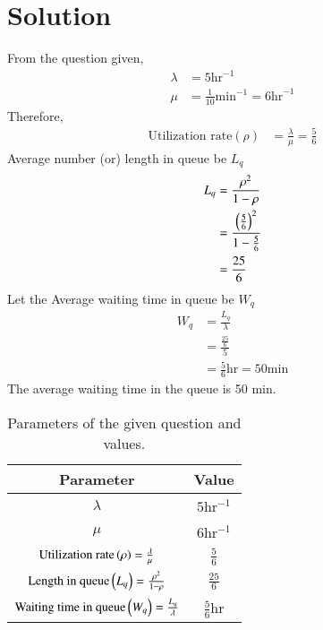 \documentclass[journal,12pt,twocolumn]{IEEEtran}
\begin{document}
\section{Solution}
From the question given,
\begin{align}
    \lambda &=5\text{hr}^{-1}\\
    \mu&=\frac{1}{10}\text{min}^{-1} =6\text{hr}^{-1}
    \end{align}
Therefore,
\begin{align}
    \text{Utilization rate}(\rho)&=\frac{\lambda}{\mu}=\frac{5}{6}
    \end{align}
Average number (or) length in queue be $L_q$
    \begin{align}
    L_q&=\frac{\rho^2}{1-\rho}\\
    &=\frac{\left(\frac{5}{6}\right)^2}{1-\frac{5}{6}}\\
    &=\frac{25}{6}
    \end{align}
Let the Average waiting time in queue be $W_q$
    \begin{align}
    W_q&=\frac{L_q}{\lambda}\\
    &=\frac{\frac{25}{6}}{5}\\
    &=\frac{5}{6}\text{hr}=50\text{min}
\end{align}
The average waiting time in the queue is 50 min.
\newpage
\begin{table}[h!]
\centering
\resizebox{\columnwidth}{!}
{
    \begin{tabular}{|c|c|}
    \hline
    Parameter & Value \\
    \hline
    $\lambda$ & $5$hr$^{-1}$\\
    \hline
    $\mu$ & $6$hr$^{-1}$\\
    \hline
    $\text{Utilization rate}\left(\rho\right)=\frac{\lambda}{\mu}$ & $\frac{5}{6}$\\[1ex]
    \hline
    $\text{Length in queue}\left(L_q\right)=\frac{\rho^2}{1-\rho}$ & $\frac{25}{6}$\\[1ex]
    \hline
    $\text{Waiting time in queue}\left(W_q\right)=\frac{L_q}{\lambda}$ & $\frac{5}{6}$hr\\[1ex]
    \hline     
    \end{tabular}
}
    \caption{Parameters of the given question and values.}
    \label{TABLE-1}
\end{table}
\end{document}
